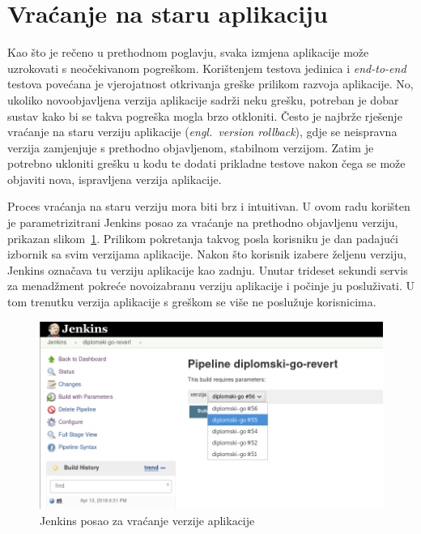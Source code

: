 \section{Vraćanje na staru aplikaciju}
Kao što je rečeno u prethodnom poglavju, svaka izmjena aplikacije može uzrokovati s neočekivanom
pogreškom. Korištenjem testova jedinica i \textit{end-to-end} testova povećana je vjerojatnost
otkrivanja greške prilikom razvoja aplikacije. No, ukoliko novoobjavljena verzija aplikacije sadrži
neku grešku, potreban je dobar sustav kako bi se takva pogreška mogla brzo otkloniti. Često je
najbrže rješenje vraćanje na staru verziju aplikacije (\textit{engl.~version rollback}), gdje se
neispravna verzija zamjenjuje s prethodno objavljenom, stabilnom verzijom. Zatim je potrebno
ukloniti grešku u kodu te dodati prikladne testove nakon čega se može objaviti nova, ispravljena
verzija aplikacije.

Proces vraćanja na staru verziju mora biti brz i intuitivan. U ovom radu korišten je
parametrizitrani Jenkins posao za vraćanje na prethodno objavljenu verziju, prikazan
slikom~\ref{fig:04jenkins_rollback}. Prilikom pokretanja takvog posla korisniku je dan padajući
izbornik sa svim verzijama aplikacije. Nakon što korisnik izabere željenu verziju, Jenkins označava
tu verziju aplikacije kao zadnju. Unutar trideset sekundi servis za menadžment pokreće novoizabranu
verziju aplikacije i počinje ju posluživati. U tom trenutku verzija aplikacije s greškom se više ne
poslužuje korisnicima.

\begin{figure}[h]
    \centering
    \includegraphics[width=\textwidth]{img/04/jenkins_rollback.png}
    \caption{Jenkins posao za vraćanje verzije aplikacije}%
    \label{fig:04jenkins_rollback}
\end{figure}
